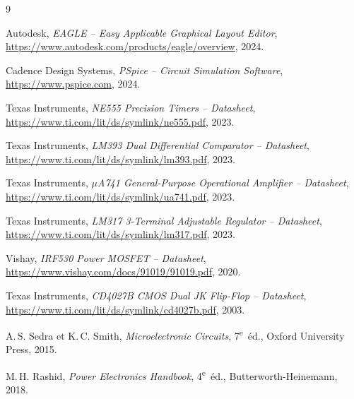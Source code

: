 \documentclass[a4paper,12pt,openany]{book}
\begin{document}
\backmatter
\begin{thebibliography}{9}

 Autodesk,
  \textit{EAGLE -- Easy Applicable Graphical Layout Editor},
  \url{https://www.autodesk.com/products/eagle/overview}, 2024.

 Cadence Design Systems,
  \textit{PSpice -- Circuit Simulation Software},
  \url{https://www.pspice.com}, 2024.

 Texas Instruments,
  \textit{NE555 Precision Timers -- Datasheet},
  \url{https://www.ti.com/lit/ds/symlink/ne555.pdf}, 2023.

 Texas Instruments,
  \textit{LM393 Dual Differential Comparator -- Datasheet},
  \url{https://www.ti.com/lit/ds/symlink/lm393.pdf}, 2023.

 Texas Instruments,
  \textit{$\mu$A741 General-Purpose Operational Amplifier -- Datasheet},
  \url{https://www.ti.com/lit/ds/symlink/ua741.pdf}, 2023.

 Texas Instruments,
  \textit{LM317 3-Terminal Adjustable Regulator -- Datasheet},
  \url{https://www.ti.com/lit/ds/symlink/lm317.pdf}, 2023.

 Vishay,
  \textit{IRF530 Power MOSFET -- Datasheet},
  \url{https://www.vishay.com/docs/91019/91019.pdf}, 2020.

 Texas Instruments,
  \textit{CD4027B CMOS Dual JK Flip-Flop -- Datasheet},
  \url{https://www.ti.com/lit/ds/symlink/cd4027b.pdf}, 2003.

 A.\,S. Sedra et K.\,C. Smith,
  \textit{Microelectronic Circuits}, 7\textsuperscript{e}~\'ed.,
  Oxford University Press, 2015.

 M.\,H. Rashid,
  \textit{Power Electronics Handbook}, 4\textsuperscript{e}~\'ed.,
  Butterworth-Heinemann, 2018.

\end{thebibliography}
\end{document}
